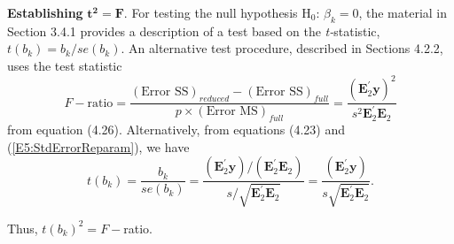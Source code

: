 \textbf{Establishing }$\mathbf{t}^{\mathbf{2}}\mathbf{=F}$. For
testing the null hypothesis H$_0$: $\beta_{k}=0$, the material in
Section 3.4.1 provides a description of a test based on the
\textit{t-}statistic, $t(b_{k})=b_{k}/se(b_{k})$. An alternative
test procedure, described in Sections 4.2.2, uses the test statistic
\begin{equation*}
F-\text{ratio} = \frac{(\text{Error SS})_{reduced}-(\text{Error SS}
)_{full}} {p \times (\text{Error MS})_{full}} = \frac{\left(
\mathbf{E}_2^{\prime}\mathbf{y}\right) ^2}{s^2\mathbf{E}_2^{\prime}
\mathbf{E}_2}
\end{equation*}
from equation (4.26). Alternatively, from equations (4.23) and
(\ref{E5:StdErrorReparam}), we have
\begin{equation}\label{E5:tStat}
t(b_{k})=\frac{b_{k}}{se(b_{k})}=\frac{\left( \mathbf{E}_2^{\prime}
\mathbf{y}\right) /\left( \mathbf{E}_2^{\prime}\mathbf{E}_2\right)}
{s/\sqrt{\mathbf{E}_2^{\prime}\mathbf{E}_2}}= \frac{\left(
\mathbf{E}_2^{\prime}\mathbf{y}\right) }{s\sqrt{
\mathbf{E}_2^{\prime}\mathbf{E}_2}}.
\end{equation}

\noindent Thus, $t(b_{k})^2=F-$ratio.


